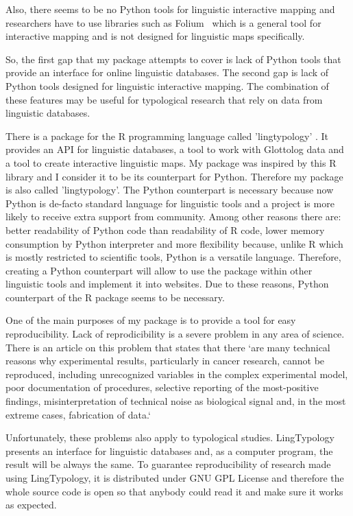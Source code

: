 \documentclass[a4paper,12pt]{article}
\begin{document}
Also, there seems to be no Python tools for linguistic interactive mapping and researchers have to use libraries such as Folium~\parencite{folium} which is a general tool for interactive mapping and is not designed for linguistic maps specifically.

So, the first gap that my package attempts to cover is lack of Python tools that provide an interface for online linguistic databases. The second gap is lack of Python tools designed for linguistic interactive mapping. The combination of these features may be useful for typological research that rely on data from linguistic databases.

There is a package for the R programming language called 'lingtypology' \parencite{GeorgeMoroz2018}. It provides an API for linguistic databases, a tool to work with Glottolog data and a tool to create interactive linguistic maps. My package was inspired by this R library and I consider it to be its counterpart for Python. Therefore my package is also called 'lingtypology'. The Python counterpart is necessary because now Python is de-facto standard language for linguistic tools and a project is more likely to receive extra support from community. Among other reasons there are: better readability of Python code than readability of R code, lower memory consumption by Python interpreter and more flexibility because, unlike R which is mostly restricted to scientific tools, Python is a versatile language. Therefore, creating a Python counterpart will allow to use the package within other linguistic tools and implement it into websites. Due to these reasons, Python counterpart of the R package seems to be necessary.

One of the main purposes of my package is to provide a tool for easy reproducibility. Lack of reprodicibility is a severe problem in any area of science. There is an article on this problem that states that there `are many technical reasons why experimental results, particularly in cancer research, cannot be reproduced, including unrecognized variables in the complex experimental model, 
poor documentation of procedures, selective reporting of the most-positive findings, 
misinterpretation of technical noise as biological signal and, in the most extreme 
cases, fabrication of data.`~\parencite{Pusztai2013}

Unfortunately, these problems also apply to typological studies. LingTypology presents an interface for linguistic databases and, as a computer program, the result will be always the same. To guarantee reproducibility of research made using LingTypology, it is distributed under GNU GPL License and therefore the whole source code is open so that anybody could read it and make sure it works as expected.
\end{document}
